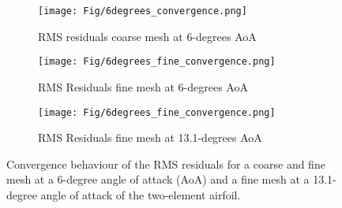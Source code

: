 


\begin{figure}[H]
  \centering
  \begin{subfigure}[b]{0.75\textwidth}
    \texttt{[image: Fig/6degrees\_convergence.png]}
    \caption{RMS residuals coarse mesh at 6-degrees AoA}
    \label{fig:RMScoarse6}
  \end{subfigure}
  \hfill
  \begin{subfigure}[b]{0.75\textwidth}
    \texttt{[image: Fig/6degrees\_fine\_convergence.png]}
    \caption{RMS Residuals fine mesh at 6-degrees AoA}
    \label{fig:RMSfine6}
  \end{subfigure}
  \hfill
  \begin{subfigure}[b]{0.75\textwidth}
    \texttt{[image: Fig/6degrees\_fine\_convergence.png]}
    \caption{RMS Residuals fine mesh at 13.1-degrees AoA}
    \label{fig:RMSfine13.1}
  \end{subfigure}
  \caption{Convergence behaviour of the RMS residuals for a coarse and fine mesh at a 6-degree angle of attack (AoA) and a fine mesh at a 13.1-degree angle of attack of the two-element airfoil.}
  \label{fig:RMS}
\end{figure}






